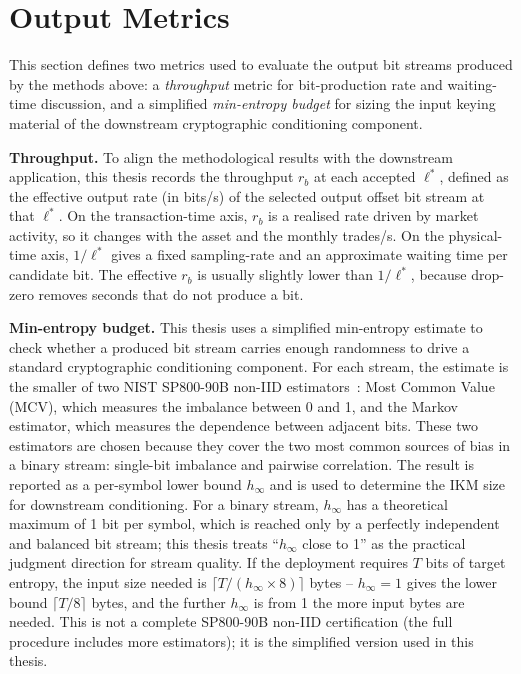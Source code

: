 \documentclass[11pt,titlepage,openany,oneside]{book}  %
\begin{document}
\section{Output Metrics}
\label{sec:output-metrics}

This section defines two metrics used to evaluate the output bit streams produced by the methods above: a \emph{throughput} metric for bit-production rate and waiting-time discussion, and a simplified \emph{min-entropy budget} for sizing the input keying material of the downstream cryptographic conditioning component.

\textbf{Throughput.} To align the methodological results with the downstream application, this thesis records the throughput $r_b$ at each accepted $\ell^*$, defined as the effective output rate (in bits/s) of the selected output offset bit stream at that $\ell^*$. On the transaction-time axis, $r_b$ is a realised rate driven by market activity, so it changes with the asset and the monthly trades/s. On the physical-time axis, $1/\ell^*$ gives a fixed sampling-rate and an approximate waiting time per candidate bit. The effective $r_b$ is usually slightly lower than $1/\ell^*$, because drop-zero removes seconds that do not produce a bit.

\textbf{Min-entropy budget.} This thesis uses a simplified min-entropy estimate to check whether a produced bit stream carries enough randomness to drive a standard cryptographic conditioning component. For each stream, the estimate is the smaller of two NIST SP800-90B non-IID estimators~\citep{turan2018sp80090b}: Most Common Value (MCV), which measures the imbalance between 0 and 1, and the Markov estimator, which measures the dependence between adjacent bits. These two estimators are chosen because they cover the two most common sources of bias in a binary stream: single-bit imbalance and pairwise correlation. The result is reported as a per-symbol lower bound $h_\infty$ and is used to determine the IKM size for downstream conditioning. For a binary stream, $h_\infty$ has a theoretical maximum of 1 bit per symbol, which is reached only by a perfectly independent and balanced bit stream; this thesis treats ``$h_\infty$ close to 1'' as the practical judgment direction for stream quality. If the deployment requires $T$ bits of target entropy, the input size needed is $\lceil T / (h_\infty \times 8) \rceil$ bytes -- $h_\infty = 1$ gives the lower bound $\lceil T / 8 \rceil$ bytes, and the further $h_\infty$ is from 1 the more input bytes are needed. This is not a complete SP800-90B non-IID certification (the full procedure includes more estimators); it is the simplified version used in this thesis.
\end{document}
